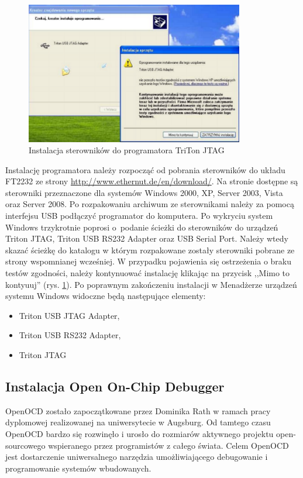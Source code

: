 \begin{figure}[ht!]
 \centering
 \includegraphics[width=0.85\textwidth]{../images/ch03/jtag-install-s2.png}
 \caption{Instalacja sterowników do programatora TriTon JTAG}
 \label{fig:TritonInstall}
\end{figure}

Instalację programatora należy rozpocząć od pobrania sterowników do układu FT2232
ze strony \url{http://www.ethernut.de/en/download/}. Na stronie dostępne są
sterowniki przeznaczone dla systemów Windows 2000, XP, Server 2003, Vista oraz
Server 2008. Po rozpakowaniu archiwum ze sterownikami należy za pomocą interfejsu
USB podłączyć programator do komputera. Po wykryciu system Windows trzykrotnie
poprosi o~podanie ścieżki do sterowników do urządzeń Triton JTAG, Triton USB
RS232 Adapter oraz USB Serial Port. Należy wtedy skazać ścieżkę do katalogu w
którym rozpakowane zostały sterowniki pobrane ze strony wspomnianej wcześniej.
W przypadku pojawienia się ostrzeżenia o braku testów zgodności, należy
kontynuować instalację klikając na przycisk ,,Mimo to kontyuuj'' (rys.
\ref{fig:TritonInstall}). Po poprawnym zakończeniu instalacji w Menadżerze urządzeń
systemu Windows widoczne będą następujące elementy:
\begin{itemize}
\setlength{\parsep}{0pt}
\setlength{\itemsep}{0mm}
\setlength{\parskip}{0pt}
  \item Triton USB JTAG Adapter,
  \item Triton USB RS232 Adapter,
  \item Triton JTAG
\end{itemize}

\subsection{Instalacja Open On-Chip Debugger}
OpenOCD zostało zapoczątkowane przez Dominika Rath w ramach pracy dyplomowej
realizowanej na uniwersytecie w Augsburg. Od tamtego czasu OpenOCD bardzo się
rozwinęło i urosło do rozmiarów aktywnego projektu open-sourcowego wspieranego
przez programistów z całego świata. Celem OpenOCD jest dostarczenie
uniwersalnego narzędzia umożliwiającego debugowanie i programowanie systemów
wbudowanych.
 
